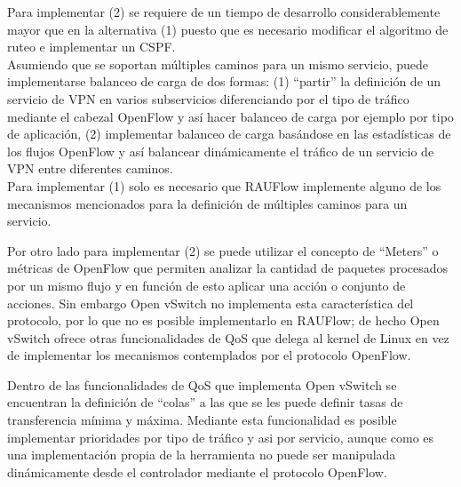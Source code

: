 Para implementar (2) se requiere de un tiempo de desarrollo considerablemente mayor que en la alternativa (1) puesto que es necesario modificar el algoritmo de ruteo e implementar un CSPF.\\ 

Asumiendo que se soportan m\'ultiples caminos para un mismo servicio, puede implementarse balanceo de carga de dos formas: (1) “partir” la definici\'on de un servicio de VPN en varios subservicios diferenciando por el tipo de tr\'afico mediante el cabezal OpenFlow y as\'i hacer balanceo de carga por ejemplo por tipo de aplicaci\'on, (2) implementar balanceo de carga basándose en las estadísticas de los flujos OpenFlow y así balancear din\'amicamente el tr\'afico de un servicio de VPN entre diferentes caminos.\\

Para implementar (1) solo es necesario que RAUFlow implemente alguno de los mecanismos mencionados para la definición de múltiples caminos para un servicio. 

Por otro lado para implementar (2) se puede utilizar el concepto de “Meters” o m\'etricas de OpenFlow que permiten analizar la cantidad de paquetes procesados por un mismo flujo y en funci\'on de esto aplicar una acci\'on o conjunto de acciones. Sin embargo Open vSwitch no implementa esta característica del protocolo, por lo que no es posible implementarlo en RAUFlow; de hecho Open vSwitch ofrece otras funcionalidades de QoS que delega al kernel de Linux en vez de implementar los mecanismos contemplados por el protocolo OpenFlow. 

Dentro de las funcionalidades de QoS que implementa Open vSwitch se encuentran la definici\'on de “colas” a las que se les puede definir tasas de transferencia mínima y máxima. Mediante esta funcionalidad es posible implementar prioridades por tipo de tr\'afico y asi por servicio, aunque como es una implementaci\'on propia de la herramienta no puede ser manipulada din\'amicamente desde el controlador mediante el protocolo OpenFlow.






